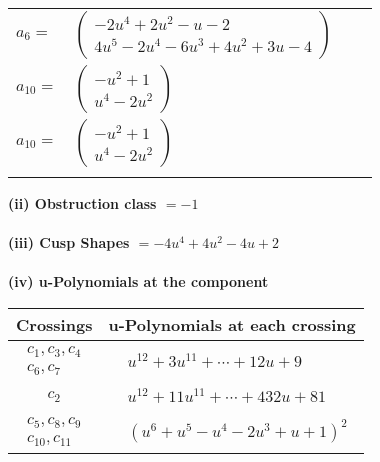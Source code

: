 \documentclass[1p]{elsarticle_modified}
\theoremstyle{definition}
\begin{document}
\begin{tabular}{m{7pt} m{180pt} m{7pt} m{180pt} }
\flushright $a_{6}=$&$\begin{pmatrix}-2 u^4+2 u^2- u-2\\4 u^5-2 u^4-6 u^3+4 u^2+3 u-4\end{pmatrix}$ \\
\flushright $a_{10}=$&$\begin{pmatrix}- u^2+1\\u^4-2 u^2\end{pmatrix}$\\ \flushright $a_{10}=$&$\begin{pmatrix}- u^2+1\\u^4-2 u^2\end{pmatrix}$\\&\end{tabular}
\flushleft \textbf{(ii) Obstruction class $= -1$}\\~\\
\flushleft \textbf{(iii) Cusp Shapes $= -4 u^4+4 u^2-4 u+2$}\\~\\
\newpage\renewcommand{\arraystretch}{1}
\flushleft \textbf{(iv) u-Polynomials at the component}\newline \\
\begin{tabular}{m{50pt}|m{274pt}}
Crossings & \hspace{64pt}u-Polynomials at each crossing \\
\hline $$\begin{aligned}c_{1},c_{3},c_{4}\\c_{6},c_{7}\end{aligned}$$&$\begin{aligned}
&u^{12}+3 u^{11}+\cdots+12 u+9
\end{aligned}$\\
\hline $$\begin{aligned}c_{2}\end{aligned}$$&$\begin{aligned}
&u^{12}+11 u^{11}+\cdots+432 u+81
\end{aligned}$\\
\hline $$\begin{aligned}c_{5},c_{8},c_{9}\\c_{10},c_{11}\end{aligned}$$&$\begin{aligned}
&(u^6+u^5- u^4-2 u^3+u+1)^2
\end{aligned}$\\
\hline
\end{tabular}\\~\\
\end{document}
